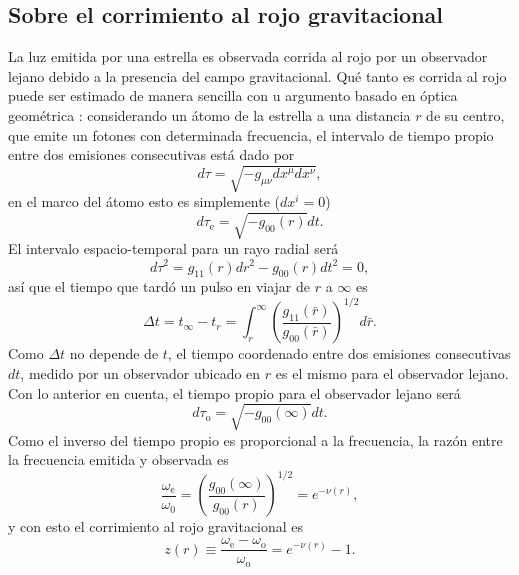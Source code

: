 \subsection*{ Sobre el corrimiento al rojo gravitacional}
La luz emitida por una estrella es observada corrida al rojo por un observador lejano debido a la presencia del campo gravitacional. Qué tanto es corrida al rojo puede ser estimado de manera sencilla con u argumento basado en óptica geométrica \cite{Glendenning2000}: considerando un átomo de la estrella a una distancia $r$ de su centro, que emite un fotones con determinada frecuencia, el intervalo de tiempo propio entre dos emisiones consecutivas está dado por
\begin{equation}
d \tau=\sqrt{-g_{\mu \nu} d x^{\mu} d x^{\nu}},
\end{equation}
en el marco del átomo esto es simplemente ($dx^i=0$)
\begin{equation}
d \tau_{\mathrm{e}}=\sqrt{-g_{00}(r)} d t.
\end{equation}
El intervalo espacio-temporal para un rayo radial será
\begin{equation}
d \tau^{2}=g_{11}(r) d r^{2} - g_{00}(r) d t^{2} = 0,
\end{equation}
así que el tiempo que tardó un pulso en viajar de $r$ a $\infty$ es
\begin{equation}\label{timeinterval}
\Delta t=t_{\infty}-t_{r}= \int_{r}^{\infty}\left(\frac{g_{11}(\bar{r})}{g_{00}(\bar{r})}\right)^{1 / 2} d \bar{r}.
\end{equation}
Como $\Delta{t}$ no depende de $t$, el tiempo coordenado entre dos emisiones consecutivas $dt$, medido por un observador ubicado en $r$ es el mismo para el observador lejano. Con lo anterior en cuenta, el tiempo propio para el observador lejano será
\begin{equation}
d \tau_{\mathrm{o}}=\sqrt{-g_{00}(\infty)} d t.
\end{equation}
Como el inverso del tiempo propio es proporcional a la frecuencia, la razón entre la frecuencia emitida y observada es
\begin{equation}
\frac{\omega_{\mathrm{e}}}{\omega_{\mathrm{0}}}=\left(\frac{g_{00}(\infty)}{g_{00}(r)}\right)^{1 / 2}=e^{-\nu(r)},
\end{equation}
y con esto el corrimiento al rojo gravitacional es
\begin{equation}
    z(r)\equiv \frac{\omega_{\mathrm{e}}-\omega_{\mathrm{o}}}{\omega_{\mathrm{o}}}  = e^{-\nu(r)}-1.
    \label{redshift}
\end{equation}

